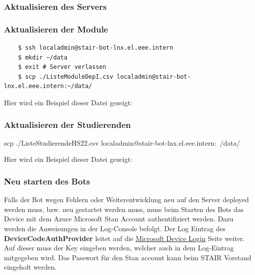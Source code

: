 \documentclass[a4paper, table]{article}
\begin{document}
\subsubsection{Aktualisieren des Servers}


\subsubsection{Aktualisieren der Module}

\begin{verbatim}
    $ ssh localadmin@stair-bot-lnx.el.eee.intern
    $ mkdir ~/data
    $ exit # Server verlassen
    $ scp ./ListeModuleDepI.csv localadmin@stair-bot-lnx.el.eee.intern:~/data/
\end{verbatim}


Hier wird ein Beispiel dieser Datei gezeigt:





\subsubsection{Aktualisieren der Studierenden}


scp ./ListeStudierendeHS22.csv  localadmin@stair-bot-lnx.el.eee.intern:~/data/

Hier wird ein Beispiel dieser Datei gezeigt:





\subsubsection{Neu starten des Bots}
Falls der Bot wegen Fehlern oder Weiterentwicklung neu auf den Server deployed werden muss, bzw. neu gestartet werden muss,
muss beim Starten des Bots das Device mit dem Azure Microsoft Stan Account authentifiziert werden.
Dazu werden die Anweisungen in der Log-Console befolgt.
Der Log Eintrag des \textbf{DeviceCodeAuthProvider} leitet auf die \href{https://microsoft.com/devicelogin}{Microsoft Device Login} Seite weiter.
Auf dieser muss der Key eingeben werden, welcher auch in dem Log-Eintrag mitgegeben wird.
Das Passwort für den Stan account kann beim STAIR Vorstand eingeholt werden.
\end{document}
